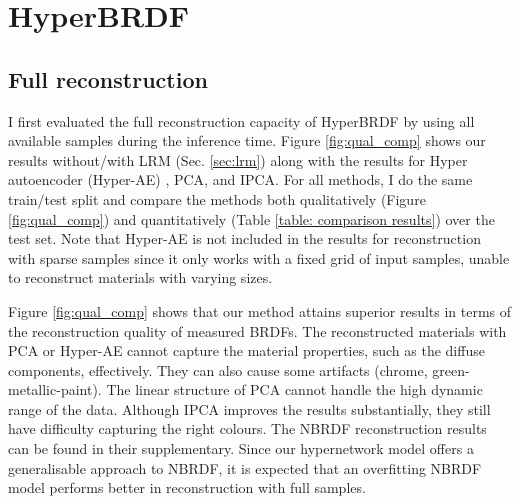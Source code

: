 \chapter{HyperBRDF}
\label{hyperbrdf:add_res}

\section{Full reconstruction}\label{sec:full_rec}

I first evaluated the full reconstruction capacity of HyperBRDF by using all available samples during the inference time. Figure \ref{fig:qual_comp} shows our results without/with LRM (Sec. \ref{sec:lrm}) along with the results for Hyper autoencoder (Hyper-AE) \cite{sztrajman2021neural}, PCA, and IPCA. For all methods, I do the same train/test split and compare the methods both qualitatively (Figure \ref{fig:qual_comp}) and quantitatively (Table \ref{table: comparison results}) over the test set. Note that Hyper-AE is not included in the results for reconstruction with sparse samples since it only works with a fixed grid of input samples, unable to reconstruct materials with varying sizes. 


Figure \ref{fig:qual_comp} shows that our method attains superior results in terms of the reconstruction quality of measured BRDFs. The reconstructed materials with PCA or Hyper-AE cannot capture the material properties, such as the diffuse components, effectively. They can also cause some artifacts (chrome, green-metallic-paint). The linear structure of PCA cannot handle the high dynamic range of the data. Although IPCA \cite{nielsen2015optimal} improves the results substantially, they still have difficulty capturing the right colours. The NBRDF \cite{sztrajman2021neural} reconstruction results can be found in their supplementary. Since our hypernetwork model offers a generalisable approach to NBRDF, it is expected that an overfitting NBRDF model performs better in reconstruction with full samples. 

